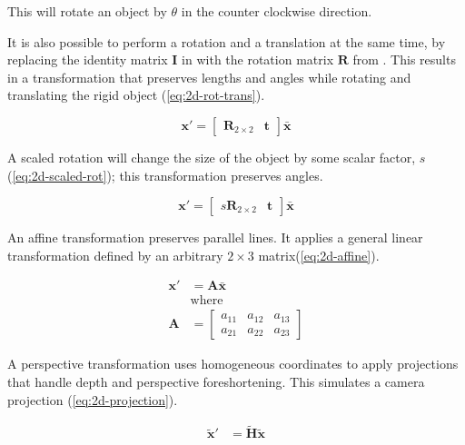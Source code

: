 This will rotate an object by $\theta$ in the counter clockwise direction. 

It is also possible to perform a rotation and a translation at the same time, by replacing the identity matrix $\mathbf{I}$ in  with the rotation matrix $\mathbf{R}$ from .
This results in a transformation that preserves lengths and angles while rotating and translating the rigid object (\cref{eq:2d-rot-trans}).

\begin{equation}
    \mathbf{x}' = \begin{bmatrix}
        \mathbf{R}_{2 \times 2} & \mathbf{t}
    \end{bmatrix} \bar{\mathbf{x}}
    \label{eq:2d-rot-trans}
\end{equation}


A scaled rotation will change the size of the object by some scalar factor, $s$ (\cref{eq:2d-scaled-rot}); this transformation preserves angles.

\begin{equation}
    \mathbf{x}' = \begin{bmatrix}
        s\mathbf{R}_{2 \times 2} & \mathbf{t}
    \end{bmatrix}\bar{\mathbf{x}}
    \label{eq:2d-scaled-rot}
\end{equation}

An affine transformation preserves parallel lines.
It applies a general linear transformation defined by an arbitrary $2 \times 3$ matrix(\cref{eq:2d-affine}).

\begin{equation}
    \begin{aligned}
        \mathbf{x}' &= \mathbf{A\bar{x}}\\
        &\text{where}\\
        \mathbf{A} &= \begin{bmatrix}
            a_{11} & a_{12} & a_{13} \\ a_{21} & a_{22} & a_{23}
        \end{bmatrix}
    \end{aligned}
    \label{eq:2d-affine}
\end{equation}

A perspective transformation uses homogeneous coordinates to apply projections that handle depth and perspective foreshortening. This simulates a camera projection (\cref{eq:2d-projection}).

\begin{equation}
    \begin{aligned}
        \tilde{\mathbf{x}}' &= \tilde{\mathbf{H}}\tilde{\mathbf{x}}\\
    \end{aligned}
    \label{eq:2d-projection}
\end{equation}

